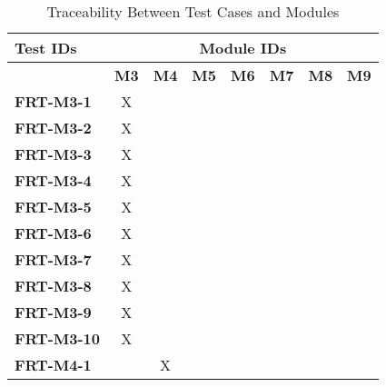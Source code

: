 \documentclass[12pt, titlepage]{article}
\begin{document}
\begin{longtable}{|l|ccccccc|}
	\caption{Traceability Between Test Cases and Modules}                                                                                             \\
	\hline
	\textbf{Test IDs}  & \multicolumn{7}{c|}{\textbf{Module IDs}}                                                                                     \\
	\hline
	~                  & \textbf{M3}                              & \textbf{M4} & \textbf{M5} & \textbf{M6} & \textbf{M7} & \textbf{M8} & \textbf{M9} \\
	\hline
	\textbf{FRT-M3-1}  & X                                        & ~           & ~           & ~           & ~           & ~           & ~           \\
	\textbf{FRT-M3-2}  & X                                        & ~           & ~           & ~           & ~           & ~           & ~           \\
	\textbf{FRT-M3-3}  & X                                        & ~           & ~           & ~           & ~           & ~           & ~           \\
	\textbf{FRT-M3-4}  & X                                        & ~           & ~           & ~           & ~           & ~           & ~           \\
	\textbf{FRT-M3-5}  & X                                        & ~           & ~           & ~           & ~           & ~           & ~           \\
	\textbf{FRT-M3-6}  & X                                        & ~           & ~           & ~           & ~           & ~           & ~           \\
	\textbf{FRT-M3-7}  & X                                        & ~           & ~           & ~           & ~           & ~           & ~           \\
	\textbf{FRT-M3-8}  & X                                        & ~           & ~           & ~           & ~           & ~           & ~           \\
	\textbf{FRT-M3-9}  & X                                        & ~           & ~           & ~           & ~           & ~           & ~           \\
	\textbf{FRT-M3-10} & X                                        & ~           & ~           & ~           & ~           & ~           & ~           \\
	\textbf{FRT-M4-1}  & ~                                        & X           & ~           & ~           & ~           & ~           & ~           \\

\end{longtable}
\end{document}
